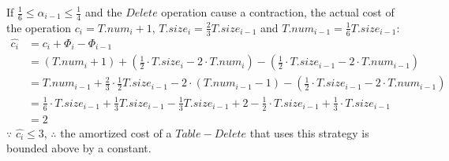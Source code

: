 \documentclass[12pt,letterpaper]{article}
\begin{document}
If $\frac{1}{6} \le \alpha_{i-1} \le \frac{1}{4}$ and the $Delete$ operation cause a contraction, the actual cost of the operation
$c_i = T.num_{i} + 1$, $T.size_{i} = \frac{2}{3} T.size_{i-1}$ and $T.num_{i-1} = \frac{1}{6} T.size_{i-1}$:
\begin{align*}
\widehat{c_i} &= c_i + \Phi_{i} - \Phi_{i-1} \\
&= (T.num_{i} +1)+ ( \frac{1}{2} \cdot T.size_{i} - 2 \cdot T.num_{i} ) - ( \frac{1}{2} \cdot T.size_{i-1} - 2 \cdot T.num_{i-1} ) \\
&= T.num_{i-1} + \frac{2}{3} \cdot \frac{1}{2} T.size_{i-1} - 2 \cdot (T.num_{i-1} - 1) - ( \frac{1}{2} \cdot T.size_{i-1} - 2 \cdot T.num_{i-1} ) \\
&= \frac{1}{6} \cdot T.size_{i-1} + \frac{1}{3} T.size_{i-1} - \frac{1}{3} T.size_{i-1} + 2 - \frac{1}{2} \cdot T.size_{i-1} + \frac{1}{3} \cdot T.size_{i-1} \\
&= 2
\end{align*}
$\because$ $\widehat{c_i} \le 3$, $\therefore$ the amortized cost of a $Table-Delete$ that uses this strategy is bounded above by a constant.
\end{document}
